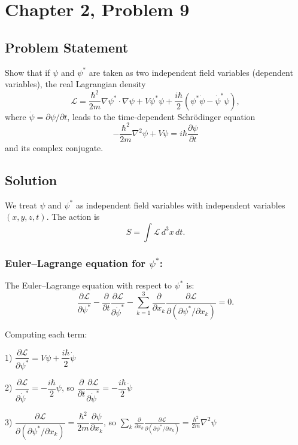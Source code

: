 \documentclass[12pt]{article}
\begin{document}
\section*{Chapter 2, Problem 9}

\subsection*{Problem Statement}
Show that if $\psi$ and $\psi^*$ are taken as two independent field variables (dependent variables), the real Lagrangian density
\[
  \mathscr{L} = \frac{\hbar^2}{2m}\nabla\psi^*\cdot\nabla\psi + V\psi^*\psi + \frac{i\hbar}{2}\left(\psi^*\dot{\psi} - \dot{\psi}^*\psi\right),
\]
where $\dot{\psi} = \partial\psi/\partial t$, leads to the time-dependent Schr\"odinger equation
\[
  -\frac{\hbar^2}{2m}\nabla^2\psi + V\psi = i\hbar\frac{\partial\psi}{\partial t}
\]
and its complex conjugate.

\subsection*{Solution}

We treat $\psi$ and $\psi^*$ as independent field variables with independent variables $(x,y,z,t)$. The action is
\[
  S = \int \mathscr{L}\,d^3x\,dt.
\]

\subsubsection*{Euler--Lagrange equation for $\psi^*$:}

The Euler--Lagrange equation with respect to $\psi^*$ is:
\[
  \frac{\partial\mathscr{L}}{\partial\psi^*}
  - \frac{\partial}{\partial t}\frac{\partial\mathscr{L}}{\partial\dot{\psi}^*}
  - \sum_{k=1}^{3}\frac{\partial}{\partial x_k}\frac{\partial\mathscr{L}}{\partial(\partial\psi^*/\partial x_k)}
  = 0.
\]

Computing each term:

1) $\dfrac{\partial\mathscr{L}}{\partial\psi^*} = V\psi + \dfrac{i\hbar}{2}\dot{\psi}$

2) $\dfrac{\partial\mathscr{L}}{\partial\dot{\psi}^*} = -\dfrac{i\hbar}{2}\psi$, so $\dfrac{\partial}{\partial t}\dfrac{\partial\mathscr{L}}{\partial\dot{\psi}^*} = -\dfrac{i\hbar}{2}\dot{\psi}$

3) $\dfrac{\partial\mathscr{L}}{\partial(\partial\psi^*/\partial x_k)} = \dfrac{\hbar^2}{2m}\dfrac{\partial\psi}{\partial x_k}$, so $\displaystyle\sum_k \frac{\partial}{\partial x_k}\frac{\partial\mathscr{L}}{\partial(\partial\psi^*/\partial x_k)} = \frac{\hbar^2}{2m}\nabla^2\psi$
\end{document}
